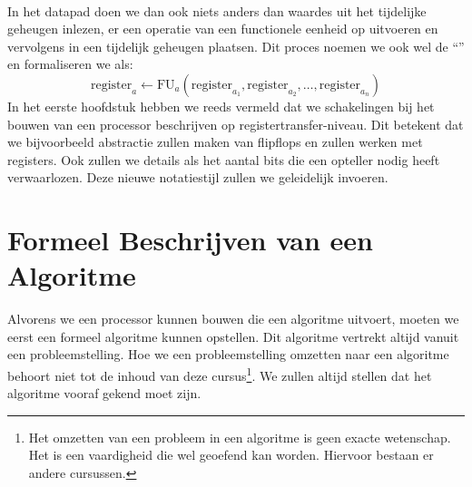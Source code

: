 \paragraph{}
In het datapad doen we dan ook niets anders dan waardes uit het tijdelijke geheugen inlezen, er een operatie van een functionele eenheid op uitvoeren en vervolgens in een tijdelijk geheugen plaatsen. Dit proces noemen we ook wel de ``'' en formaliseren we als:
\begin{equation}
\mbox{register}_a\leftarrow\mbox{FU}_a\left(\mbox{register}_{a_1},\mbox{register}_{a_2},\ldots,\mbox{register}_{a_n}\right)
\end{equation}
In het eerste hoofdstuk hebben we reeds vermeld dat we schakelingen bij het bouwen van een processor beschrijven op registertransfer-niveau. Dit betekent dat we bijvoorbeeld abstractie zullen maken van flipflops en zullen werken met registers. Ook zullen we details als het aantal bits die een opteller nodig heeft verwaarlozen. Deze nieuwe notatiestijl zullen we geleidelijk invoeren.
\section{Formeel Beschrijven van een Algoritme}
\label{s:descriptionFSMD}
Alvorens we een processor kunnen bouwen die een algoritme uitvoert, moeten we eerst een formeel algoritme kunnen opstellen. Dit algoritme vertrekt altijd vanuit een probleemstelling. Hoe we een probleemstelling omzetten naar een algoritme behoort niet tot de inhoud van deze cursus\footnote{Het omzetten van een probleem in een algoritme is geen exacte wetenschap. Het is een vaardigheid die wel geoefend kan worden. Hiervoor bestaan er andere cursussen.}. We zullen altijd stellen dat het algoritme vooraf gekend moet zijn.
